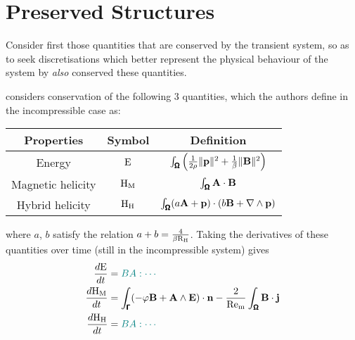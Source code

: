 \section{Preserved Structures}
    
    Consider first those quantities that are conserved by the transient system, so as to seek discretisations which better represent the physical behaviour of the system by \emph{also} conserved these quantities. 
    
    \cite{LHF22} considers conservation of the following 3 quantities, which the authors define in the incompressible case as: 
    \begin{center}\begin{tabular}{ c c c }
        Properties  &  Symbol  &  Definition  \\
        \hline\hline
        Energy  &  $\mathrm{E}$  &  $\int_{\pmb{\mathsf{\Omega}}}\left(\frac{1}{2\rho}\|\mathbf{p}\|^{2} + \frac{1}{\beta}\|\mathbf{B}\|^{2}\right)$  \\
        Magnetic helicity  &  $\mathrm{H}_{\mathrm{M}}$  &  $\int_{\pmb{\mathsf{\Omega}}}\mathbf{A}\cdot\mathbf{B}$  \\
        Hybrid helicity  &  $\mathrm{H}_{\mathrm{H}}$  &  $\int_{\pmb{\mathsf{\Omega}}}(a\mathbf{A} + \mathbf{p})\cdot(b\mathbf{B} + \nabla\wedge\mathbf{p})$
    \end{tabular}\end{center}
    where $a$, $b$ satisfy the relation $a + b  =  \frac{4}{\beta\mathrm{R}_{\mathrm{H}}}$.  Taking the derivatives of these quantities over time (still in the incompressible system) gives
    \begin{align}
        \frac{d\mathrm{E}}{dt}  &=  \textcolor{teal}{BA: \cdots}  \\
        \frac{d\mathrm{H}_{\mathrm{M}}}{dt}  &=  \int_{\pmb{\mathsf{\Gamma}}}(- \varphi\mathbf{B} + \mathbf{A}\wedge\mathbf{E})\cdot\mathbf{n} - \frac{2}{\mathrm{Re}_{\mathrm{m}}}\int_{\pmb{\mathsf{\Omega}}}\mathbf{B}\cdot\mathbf{j}  \\
        \frac{d\mathrm{H}_{\mathrm{H}}}{dt}  &=  \textcolor{teal}{BA: \cdots} \\
    \end{align}

    